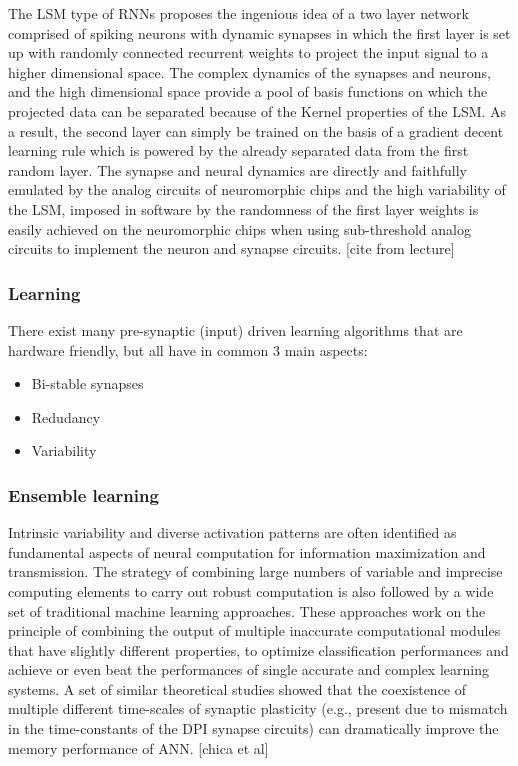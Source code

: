 \documentclass[main]{subfiles}
\begin{document}
The LSM type of RNNs proposes the ingenious idea of a two layer network comprised of spiking neurons with dynamic synapses in which the first layer is set up with randomly connected recurrent weights to project the input signal to a higher dimensional space. The complex dynamics of the synapses and neurons, and the high dimensional space provide a pool of basis functions on which the projected data can be separated because of the Kernel properties of the LSM. As a result, the second layer can simply be trained on the basis of a gradient decent learning rule which is powered by the already separated data from the first random layer. The synapse and neural dynamics are directly and faithfully emulated by the analog circuits of neuromorphic chips and the high variability of the LSM, imposed in software by the randomness of the first layer weights is easily achieved on the neuromorphic chips when using sub-threshold analog circuits to implement the neuron and synapse circuits. [cite from lecture]

\subsubsection{Learning}

There exist many pre-synaptic (input) driven learning algorithms that are hardware friendly, but all have in common 3 main aspects:

\begin{itemize}
    \item Bi-stable synapses
    \item Redudancy
    \item Variability
\end{itemize}

\subsubsection*{Ensemble learning}

Intrinsic variability  and  diverse  activation  patterns  are  often  identified as fundamental aspects of neural computation for information maximization and transmission. The strategy of combining large numbers of variable and imprecise computing elements to carry out robust computation is also followed by a wide set of traditional machine learning approaches. These approaches work on the principle of combining the output of multiple inaccurate computational modules that have slightly different properties, to optimize classification performances and achieve or even beat the performances of single accurate and complex learning systems. A set of similar theoretical studies showed that the coexistence of multiple different time-scales of synaptic plasticity (e.g., present due to mismatch in the time-constants of the DPI synapse circuits) can dramatically improve the memory performance of ANN. [chica et al]
\end{document}
